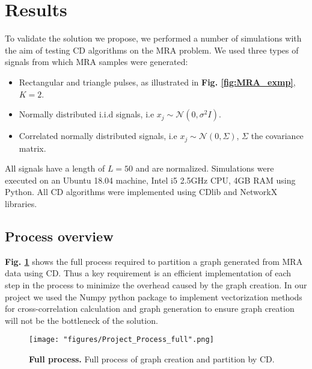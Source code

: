 \center

\section{Results}

\raggedright

To validate the solution we propose, we performed a number of simulations with the aim of testing \acrshort{CD} algorithms on the \acrshort{MRA} problem. We used three types of signals from which \acrshort{MRA} samples were generated:

\begin{itemize}
\item Rectangular and triangle pulses, as illustrated in \textbf{Fig. \ref{fig:MRA_exmp}}, $K =2$.

\item Normally distributed i.i.d signals, i.e $x_j \sim \mathcal{N}(0,\sigma^2I)$.

\item Correlated normally distributed signals, i.e $x_j \sim \mathcal{N}(0,\Sigma)$, $\Sigma$ the covariance matrix.
\end{itemize}
All signals have a length of $L=50$ and are normalized.
Simulations were executed on an Ubuntu 18.04 machine, Intel i5 2.5GHz CPU, 4GB RAM using Python. All \acrshort{CD} algorithms were implemented using CDlib and NetworkX libraries.

\subsection{Process overview}
\textbf{Fig. \ref{fig:full_process}} shows the full process required to partition a graph generated from \acrshort{MRA} data using \acrlong{CD}. Thus a key requirement is an efficient implementation of each step in the process to minimize the overhead caused by the graph creation. In our project we used the Numpy python package to implement vectorization methods for cross-correlation calculation and graph generation to ensure graph creation will not be the bottleneck of the solution.

\begin{figure}[h]
  \centering
  \texttt{[image: "figures/Project\_Process\_full".png]}
  \caption{\textbf{Full process.} Full process of graph creation and partition by \acrshort{CD}.}
  \label{fig:full_process}
\end{figure}

\clearpage

